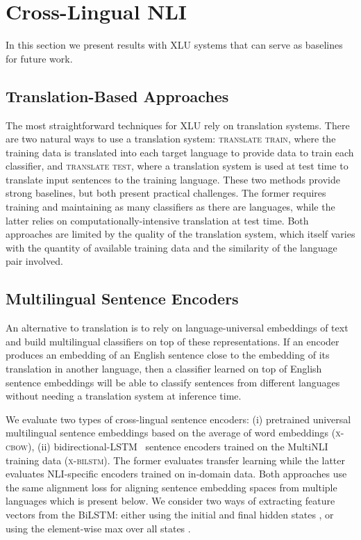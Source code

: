 \documentclass[11pt,a4paper]{article}
\begin{document}
\insertalignment


\section{Cross-Lingual NLI}
\label{SectBaselines}

In this section we present results with XLU systems that can serve as baselines for future work.

\subsection{Translation-Based Approaches}

The most straightforward techniques for XLU rely on translation systems. There are two natural ways to use a translation system:
\textsc{translate train}, where the training data is translated into each target language to provide data to train each classifier, and \textsc{translate test}, where a translation system is used at test time to translate input sentences to the training language. These two methods provide strong baselines, but both present practical challenges. The former requires training and maintaining as many classifiers as there are languages, while the latter relies on computationally-intensive translation at test time. Both approaches are limited by the quality of the translation system, which itself varies with the quantity of available training data and the similarity of the language pair involved.

\subsection{Multilingual Sentence Encoders}
\label{SectMLenc}

An alternative to translation is to rely on language-universal embeddings of text and build multilingual classifiers on top of these representations. If an encoder produces an embedding of an English sentence close to the embedding of its translation in another language, then a classifier learned on top of English sentence embeddings will be able to classify sentences from different languages without needing a translation system at inference time.

We evaluate two types of cross-lingual sentence encoders: (i) pretrained universal multilingual sentence embeddings based on the average of word embeddings (\textsc{x-cbow}), (ii) bidirectional-LSTM~\cite{hochreiter1997long} sentence encoders trained on the MultiNLI training data (\textsc{x-bilstm}). The former evaluates transfer learning while the latter evaluates NLI-specific encoders trained on in-domain data. Both approaches use the same alignment loss for aligning sentence embedding spaces from multiple languages which is present below. We consider two ways of extracting feature vectors from the BiLSTM: either using the initial and final hidden states \cite{sutskever2014sequence}, or using the element-wise max over all states \citep{collobert2008unified}.
\end{document}
